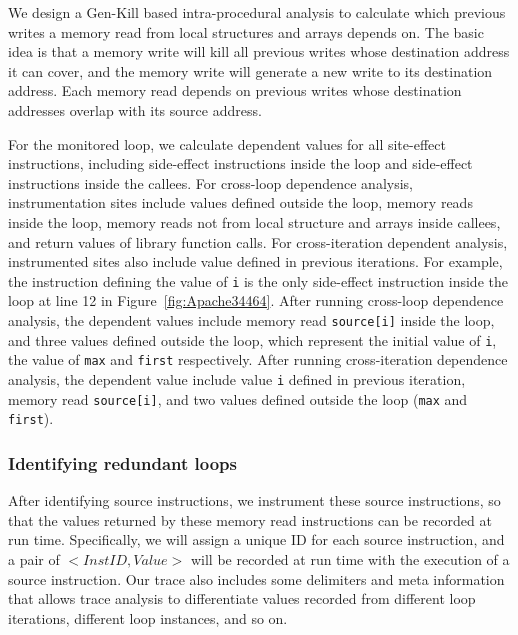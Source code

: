 {We design a Gen-Kill based intra-procedural analysis to 
calculate which previous writes a memory read from local structures and arrays depends on. 
The basic idea is that a memory write will kill all previous writes whose destination address it can cover, 
and the memory write will generate a new write to its destination address. 
Each memory read depends on previous writes whose destination addresses overlap with its source address. 

For the monitored loop, we calculate dependent values for all site-effect instructions, 
including side-effect instructions inside the loop and side-effect instructions inside the callees. 
For cross-loop dependence analysis, instrumentation sites include values defined outside the loop, 
memory reads inside the loop, memory reads not from local structure and arrays inside callees, 
and return values of library function calls. 
For cross-iteration dependent analysis, instrumented sites also include value defined in previous iterations. 
For example, the instruction defining the value of \texttt{i} is the only side-effect instruction 
inside the loop at line 12 in Figure~\ref{fig:Apache34464}. 
After running cross-loop dependence analysis, the dependent values include 
memory read \texttt{source[i]} inside the loop, 
and three values defined outside the loop, 
which represent the initial value of \texttt{i}, the value of \texttt{max} and \texttt{first} respectively. 
After running cross-iteration dependence analysis, 
the dependent value include value \texttt{i} defined in previous iteration, 
memory read \texttt{source[i]}, 
and two values defined outside the loop (\texttt{max} and \texttt{first}).  

}

\subsubsection{Identifying redundant loops}
\label{sec:cal}

After identifying source instructions, we instrument these source
instructions, so that the values returned by these memory read
instructions can be recorded at run time. Specifically, we will assign
a unique ID for each source instruction, and a pair of $<InstID, Value>$
will be recorded at run time with the execution of a source instruction.
Our trace also includes some delimiters and meta information that allows
trace analysis to differentiate values recorded from different loop
iterations, different loop instances, and so on.



